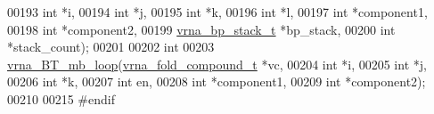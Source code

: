\begin{DoxyCode}
00193                       \textcolor{keywordtype}{int} *i,
00194                       \textcolor{keywordtype}{int} *j,
00195                       \textcolor{keywordtype}{int} *k,
00196                       \textcolor{keywordtype}{int} *l,
00197                       \textcolor{keywordtype}{int} *component1,
00198                       \textcolor{keywordtype}{int} *component2,
00199                       \hyperlink{group__data__structures_structvrna__bp__stack__s}{vrna\_bp\_stack\_t} *bp\_stack,
00200                       \textcolor{keywordtype}{int} *stack\_count);
00201 
00202 \textcolor{keywordtype}{int}
00203 \hyperlink{group__loops_ga9cb520ddfd8b3a48089a7910b045d06b}{vrna\_BT\_mb\_loop}(\hyperlink{group__fold__compound_structvrna__fc__s}{vrna\_fold\_compound\_t} *vc,
00204                 \textcolor{keywordtype}{int} *i,
00205                 \textcolor{keywordtype}{int} *j,
00206                 \textcolor{keywordtype}{int} *k,
00207                 \textcolor{keywordtype}{int} en,
00208                 \textcolor{keywordtype}{int} *component1,
00209                 \textcolor{keywordtype}{int} *component2);
00210 
00215 \textcolor{preprocessor}{#endif}
\end{DoxyCode}
